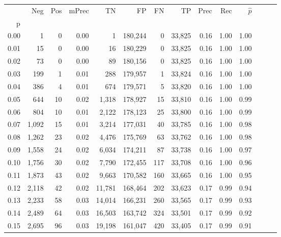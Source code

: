 \begin{tabular}{rrrrrrrrrrrrrr}
\toprule
{} &    Neg &  Pos & mPrec &       TN &       FP &      FN &      TP &  Prec &   Rec & $\hat{p}$ \\
p    &        &      &       &          &          &         &         &       &       &           \\
\midrule
0.00 &      1 &    0 &  0.00 &        1 &  180,244 &       0 &  33,825 &  0.16 &  1.00 &      1.00 \\
0.01 &     15 &    0 &  0.00 &       16 &  180,229 &       0 &  33,825 &  0.16 &  1.00 &      1.00 \\
0.02 &     73 &    0 &  0.00 &       89 &  180,156 &       0 &  33,825 &  0.16 &  1.00 &      1.00 \\
0.03 &    199 &    1 &  0.01 &      288 &  179,957 &       1 &  33,824 &  0.16 &  1.00 &      1.00 \\
0.04 &    386 &    4 &  0.01 &      674 &  179,571 &       5 &  33,820 &  0.16 &  1.00 &      1.00 \\
0.05 &    644 &   10 &  0.02 &    1,318 &  178,927 &      15 &  33,810 &  0.16 &  1.00 &      0.99 \\
0.06 &    804 &   10 &  0.01 &    2,122 &  178,123 &      25 &  33,800 &  0.16 &  1.00 &      0.99 \\
0.07 &  1,092 &   15 &  0.01 &    3,214 &  177,031 &      40 &  33,785 &  0.16 &  1.00 &      0.98 \\
0.08 &  1,262 &   23 &  0.02 &    4,476 &  175,769 &      63 &  33,762 &  0.16 &  1.00 &      0.98 \\
0.09 &  1,558 &   24 &  0.02 &    6,034 &  174,211 &      87 &  33,738 &  0.16 &  1.00 &      0.97 \\
0.10 &  1,756 &   30 &  0.02 &    7,790 &  172,455 &     117 &  33,708 &  0.16 &  1.00 &      0.96 \\
0.11 &  1,873 &   43 &  0.02 &    9,663 &  170,582 &     160 &  33,665 &  0.16 &  1.00 &      0.95 \\
0.12 &  2,118 &   42 &  0.02 &   11,781 &  168,464 &     202 &  33,623 &  0.17 &  0.99 &      0.94 \\
0.13 &  2,233 &   58 &  0.03 &   14,014 &  166,231 &     260 &  33,565 &  0.17 &  0.99 &      0.93 \\
0.14 &  2,489 &   64 &  0.03 &   16,503 &  163,742 &     324 &  33,501 &  0.17 &  0.99 &      0.92 \\
0.15 &  2,695 &   96 &  0.03 &   19,198 &  161,047 &     420 &  33,405 &  0.17 &  0.99 &      0.91 \\

\end{tabular}
